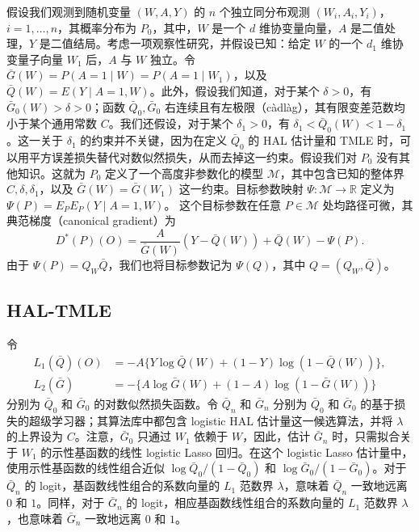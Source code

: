 假设我们观测到随机变量 $(W,A,Y)$ 的 $n$ 个独立同分布观测 $(W_i,A_i,Y_i)$，$i=1,\ldots,n$，其概率分布为 $P_0$，其中，$W$ 是一个 $d$ 维协变量向量，$A$ 是二值处理，$Y$ 是二值结局。考虑一项观察性研究，并假设已知：给定 $W$ 的一个 $d_1$ 维协变量子向量 $W_1$ 后，$A$ 与 $W$ 独立。令 $\bar G(W)=P(A=1\mid W)=P(A=1\mid W_1)$，以及 $\bar Q(W)=E(Y\mid A=1,W)$。此外，假设我们知道，对于某个 $\delta>0$，有 $\bar G_0(W)>\delta>0$；函数 $\bar Q_0,\bar G_0$ 右连续且有左极限（càdlàg），其有限变差范数均小于某个通用常数 $C$。我们还假设，对于某个 $\delta_1>0$，有 $\delta_1<\bar Q_0(W)<1-\delta_1$。这一关于 $\delta_1$ 的约束并不关键，因为在定义 $\bar Q_0$ 的 HAL 估计量和 TMLE 时，可以用平方误差损失替代对数似然损失，从而去掉这一约束。假设我们对 $P_0$ 没有其他知识。这就为 $P_0$ 定义了一个高度非参数化的模型 $\mathcal M$，其中包含已知的整体界 $C,\delta,\delta_1$，以及 $\bar G(W)=\bar G(W_1)$ 这一约束。目标参数映射 $\Psi:\mathcal M\to\mathbb R$ 定义为
$\Psi(P)=E_PE_P(Y\mid A=1,W)$。
这个目标参数在任意 $P\in\mathcal M$ 处均路径可微，其典范梯度（canonical gradient）为
\[
 D^*(P)(O)=\frac{A}{\bar G(W)}(Y-\bar Q(W))+\bar Q(W)-\Psi(P).
\]
由于 $\Psi(P)=Q_W\bar Q$，我们也将目标参数记为 $\Psi(Q)$，其中 $Q=(Q_W,\bar Q)$。

\subsection{HAL-TMLE}
\label{subsec:ch07-hal-tmle}

令
\[
 \begin{aligned}
 L_1(\bar Q)(O)
   &=-A\{Y\log\bar Q(W)+(1-Y)\log(1-\bar Q(W))\},\\
 L_2(\bar G)
   &=-\{A\log\bar G(W)+(1-A)\log(1-\bar G(W))\}
 \end{aligned}
\]
分别为 $\bar Q_0$ 和 $\bar G_0$ 的对数似然损失函数。令 $\bar Q_n$ 和 $\bar G_n$ 分别为 $\bar Q_0$ 和 $\bar G_0$ 的基于损失的超级学习器；其算法库中都包含 logistic HAL 估计量这一候选算法，并将 $\lambda$ 的上界设为 $C$。注意，$\bar G_0$ 只通过 $W_1$ 依赖于 $W$，因此，估计 $\bar G_n$ 时，只需拟合关于 $W_1$ 的示性基函数的线性 logistic Lasso 回归。在这个 logistic Lasso 估计量中，使用示性基函数的线性组合近似 $\log\bar Q_0/(1-\bar Q_0)$ 和 $\log\bar G_0/(1-\bar G_0)$。对于 $\bar Q_n$ 的 logit，基函数线性组合的系数向量的 $L_1$ 范数界 $\lambda$，意味着 $\bar Q_n$ 一致地远离 $0$ 和 $1$。同样，对于 $\bar G_n$ 的 logit，相应基函数线性组合的系数向量的 $L_1$ 范数界 $\lambda$，也意味着 $\bar G_n$ 一致地远离 $0$ 和 $1$。


